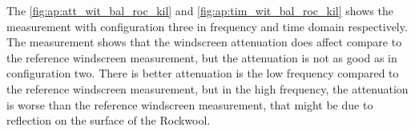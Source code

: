 The \autoref{fig:ap:att_wit_bal_roc_kil} and \autoref{fig:ap:tim_wit_bal_roc_kil} shows the measurement with configuration three in frequency and time domain respectively. The measurement shows that the windscreen attenuation does affect compare to the reference windscreen measurement, but the attenuation is not as good as in configuration two. There is better attenuation is the low frequency compared to the reference windscreen measurement, but in the high frequency, the attenuation is worse than the reference windscreen measurement, that might be due to reflection on the surface of the Rockwool.
